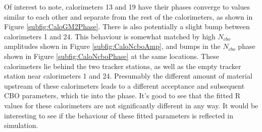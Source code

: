 	Of interest to note, calorimeters 13 and 19 have their \gmtwo phases converge to values similar to each other and separate from the rest of the calorimeters, as shown in Figure \ref{subfig:CaloGM2Phase}. There is also potentially a slight bump between calorimeters 1 and 24. This behaviour is somewhat matched by high $N_{cbo}$ amplitudes shown in Figure \ref{subfig:CaloNcboAmp}, and bumps in the $N_{cbo}$ phase shown in Figure \ref{subfig:CaloNcboPhase} at the same locations. These calorimeters lie behind the two tracker stations, as well as the empty tracker station near calorimeters 1 and 24. Presumably the different amount of material upstream of these calorimeters leads to a different acceptance and subsequent CBO parameters, which tie into the \gmtwo phase. It's good to see that the fitted R values for these calorimeters are not significantly different in any way. It would be interesting to see if the behaviour of these fitted parameters is reflected in simulation.


